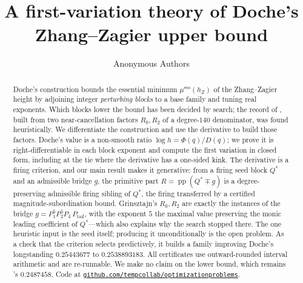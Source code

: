 \documentclass[11pt,reqno]{amsart}
\theoremstyle{plain}
\theoremstyle{definition}
\newcommand{\hZ}{h_Z}
\newcommand{\essmin}{\mu^{\mathrm{ess}}(\hZ)}
\DeclareMathOperator{\pp}{pp}
\newcommand{\repo}{\href{https://github.com/tempcollab/optimizationproblems/tree/main/constants/82a}{\texttt{github.com/tempcollab/optimizationproblems}}}
\begin{document}
\title[A first-variation theory for the Zhang--Zagier upper bound]
{A first-variation theory of Doche's Zhang--Zagier upper bound}

\author{Anonymous Authors}




\date{}


\begin{abstract}
Doche's construction bounds the essential minimum $\essmin$ of the Zhang--Zagier
height by adjoining integer \emph{perturbing blocks} to a base family and tuning real
exponents. Which blocks lower the bound has been decided by search; the record of
\citet{Gri26}, built from two near-cancellation factors $R_0,R_2$ of a degree-$140$
denominator, was found heuristically. We differentiate the construction and use the
derivative to build those factors. Doche's value is a non-smooth ratio
$\log h=\Phi(q)/D(q)$; we prove it is right-differentiable in each block exponent and
compute the first variation in closed form, including at the tie where the derivative
has a one-sided kink. The derivative is a firing criterion, and our main result makes
it generative: from a firing seed block $Q^*$ and an admissible bridge $g$, the
primitive part $R=\pp(Q^*\mp g)$ is a degree-preserving admissible firing sibling of
$Q^*$, the firing transferred by a certified magnitude-subordination bound. Grinsztajn's
$R_0,R_2$ are exactly the instances of the bridge $g=P_1^5P_2^5P_4\,P_{\mathrm{tail}}$,
with the exponent $5$ the maximal value preserving the monic leading coefficient of
$Q^*$---which also explains why the search stopped there. The one heuristic input is the seed itself; producing it
unconditionally is the open problem. As a check that the criterion selects
predictively, it builds a family improving Doche's longstanding $0.25443677$ to
$0.2538893183$. All certificates use outward-rounded interval arithmetic and are
re-runnable. We make no claim on the lower bound, which remains \citet{F18}'s
$0.2487458$. Code at \repo.
\end{abstract}
\end{document}

